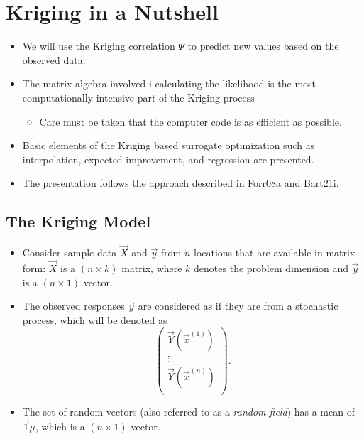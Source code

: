 \documentclass[
  letterpaper,
  DIV=11,
  numbers=noendperiod]{scrreprt}
\providecommand{\tightlist}{%
  \setlength{\itemsep}{0pt}\setlength{\parskip}{0pt}}\usepackage{longtable,booktabs,array}
\begin{document}
\hypertarget{kriging-in-a-nutshell}{%
\section{Kriging in a Nutshell}\label{kriging-in-a-nutshell}}

\begin{itemize}
\tightlist
\item
  We will use the Kriging correlation \(\Psi\) to predict new values
  based on the observed data.
\item
  The matrix algebra involved i calculating the likelihood is the most
  computationally intensive part of the Kriging process

  \begin{itemize}
  \tightlist
  \item
    Care must be taken that the computer code is as efficient as
    possible.
  \end{itemize}
\item
  Basic elements of the Kriging based surrogate optimization such as
  interpolation, expected improvement, and regression are presented.
\item
  The presentation follows the approach described in Forr08a and
  Bart21i.
\end{itemize}

\hypertarget{the-kriging-model}{%
\subsection{The Kriging Model}\label{the-kriging-model}}

\begin{itemize}
\item
  Consider sample data \(\vec{X}\) and \(\vec{y}\) from \(n\) locations
  that are available in matrix form: \(\vec{X}\) is a \((n \times k)\)
  matrix, where \(k\) denotes the problem dimension and \(\vec{y}\) is a
  \((n\times 1)\) vector.
\item
  The observed responses \(\vec{y}\) are considered as if they are from
  a stochastic process, which will be denoted as \begin{equation*}
  \begin{pmatrix}
  \vec{Y}(\vec{x}^{(1)})\\
  \vdots\\
  \vec{Y}(\vec{x}^{(n)})\\
  \end{pmatrix}.
  \end{equation*}
\item
  The set of random vectors (also referred to as a \emph{random field})
  has a mean of \(\vec{1} \mu\), which is a \((n\times 1)\) vector.
\end{itemize}
\end{document}
